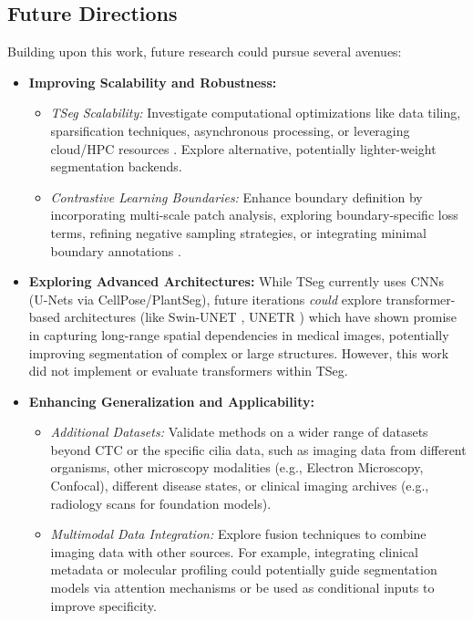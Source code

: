\documentclass[./dissertation.tex]{subfiles}
\begin{document}
\subsection*{Future Directions}
Building upon this work, future research could pursue several avenues:
\begin{itemize}
    \item \textbf{Improving Scalability and Robustness:}
          \begin{itemize}
              \item \textit{TSeg Scalability:} Investigate computational optimizations like data tiling, sparsification techniques, asynchronous processing, or leveraging cloud/HPC resources \cite{dissertation.pdf}. Explore alternative, potentially lighter-weight segmentation backends. %
              \item \textit{Contrastive Learning Boundaries:} Enhance boundary definition by incorporating multi-scale patch analysis, exploring boundary-specific loss terms, refining negative sampling strategies, or integrating minimal boundary annotations \cite{dissertation.pdf}. %
          \end{itemize}
    \item \textbf{Exploring Advanced Architectures:} While TSeg currently uses CNNs (U-Nets via CellPose/PlantSeg), future iterations \textit{could} explore transformer-based architectures (like Swin-UNET \cite{dissertation.pdf}, UNETR \cite{dissertation.pdf}) which have shown promise in capturing long-range spatial dependencies in medical images, potentially improving segmentation of complex or large structures. However, this work did not implement or evaluate transformers within TSeg. %
    \item \textbf{Enhancing Generalization and Applicability:}
          \begin{itemize}
              \item \textit{Additional Datasets:} Validate methods on a wider range of datasets beyond CTC or the specific cilia data, such as imaging data from different organisms, other microscopy modalities (e.g., Electron Microscopy, Confocal), different disease states, or clinical imaging archives (e.g., radiology scans for foundation models). %
              \item \textit{Multimodal Data Integration:} Explore fusion techniques to combine imaging data with other sources. For example, integrating clinical metadata or molecular profiling could potentially guide segmentation models via attention mechanisms or be used as conditional inputs to improve specificity. %

\end{itemize}
\end{itemize}
\end{document}
